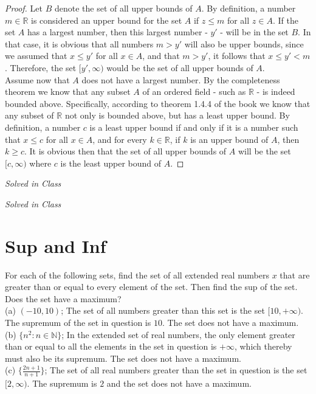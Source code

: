 \documentclass[12pt]{book}
\newenvironment{exercise}[2][Exercise]{\begin{trivlist}
\item[\hskip \labelsep {\bfseries #1}\hskip \labelsep {\bfseries #2.}]}{\end{trivlist}}
\begin{document}
\begin{proof}
Let $B$ denote the set of all upper bounds of $A$. By definition, a number $m \in \mathbb{R}$ is considered an upper bound for the set $A$ if $z \leq m$ for all $z \in A$. If the set $A$ has a largest number, then this largest number - $y'$ - will be in the set $B$. In that case, it is obvious that all numbers $m > y'$ will also be upper bounds, since we assumed that $x \leq y'$ for all $x \in A$, and that $m > y'$, it follows that $x \leq y' < m$. Therefore, the set $[y', \infty)$ would be the set of all upper bounds of $A$. \\
Assume now that $A$ does not have a largest number. By the completeness theorem we know that any subset $A$ of an ordered field - such as $\mathbb{R}$ - is indeed bounded above. Specifically, according to theorem 1.4.4 of the book we know that any subset of $\mathbb{R}$ not only is bounded above, but has a least upper bound. By definition, a number $c$ is a least upper bound if and only if it is a number such that $x \leq c$ for all $x \in A$, and for every $k \in \mathbb{R}$, if $k$ is an upper bound of $A$, then $k \geq c$. It is obvious then that the set of all upper bounds of $A$ will be the set $[c, \infty)$ where $c$ is the least upper bound of $A$.
\end{proof}


\begin{exercise}{1.4.4}
\emph{Solved in Class}
\end{exercise}

\begin{exercise}{1.4.7}
\emph{Solved in Class}
\end{exercise}

\section{Sup and Inf}

\begin{exercise}{1.5.1}
For each of the following sets, find the set of all extended real numbers $x$ that are greater than or equal to every element of the set. Then find the sup of the set. Does the set have a maximum? \\
(a) $(-10, 10)$; The set of all numbers greater than this set is the set $[10, +\infty)$. The supremum of the set in question is $10$. The set does not have a maximum.\\
(b) $\{n^2 : n \in \mathbb{N}\}$; In the extended set of real numbers, the only element greater than or equal to all the elements in the set in question is $+\infty$, which thereby must also be its supremum. The set does not have a maximum.\\
(c) $\{ \frac{2n+1}{n+1}\}$; The set of all real numbers greater than the set in question is the set $[2,\infty)$. The supremum is $2$ and the set does not have a maximum.
\end{exercise}
\end{document}
